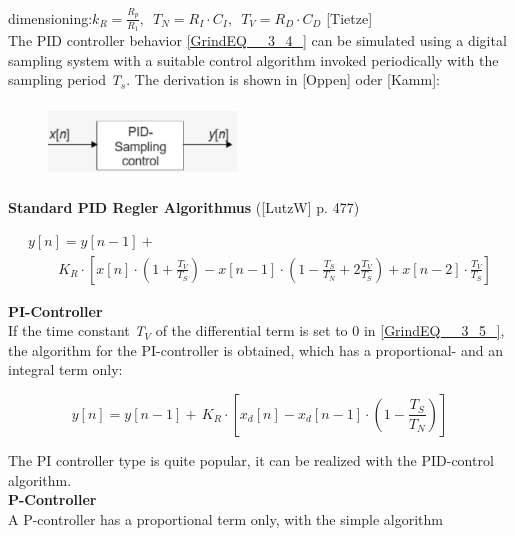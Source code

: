 dimensioning:$k_{R} =\frac{R_{p} }{R_{1} } ,\, \, \, T_{N} =R_{I} \cdot C_{I} ,\, \, \, T_{V} =R_{D} \cdot C_{D} $     [Tietze]\\

The PID controller behavior \eqref{GrindEQ__3_4_} can be simulated using a digital sampling system with a suitable control algorithm invoked periodically with the sampling period \textit{T${}_{s}$}. The derivation is shown in [Oppen] oder [Kamm]:

	\begin{figure}[h]
    \centering
    \includegraphics[width=5cm, height=2cm]{Images/image150.png}
    \label{fig:Fig }
    \end{figure}

\textbf{Standard PID Regler Algorithmus}  ([LutzW] p. 477)

\begin{equation}
	\begin{array}{l} {y[n]=y[n-1]+} \\ {\, \, \, \, \, \, \, \, \, \, \, \, \, K_{R} \cdot \left[x[n]\cdot \left(1+\frac{T_{V} }{T_{S} } \right)-x[n-1]\cdot \left(1-\frac{T_{S} }{T_{N} } +2\frac{T_{V} }{T_{S} } \right)+x[n-2]\cdot \frac{T_{V} }{T_{S} } \right]} \end{array}
\label{EQ }
\end{equation}

{\rot\bf PI-Controller }\\

If the time constant \textit{T${}_{V}$} of the differential term is set to 0 in \eqref{GrindEQ__3_5_}, the algorithm for the PI-controller is obtained, which has a proportional- and an integral term only:

\begin{equation}
	y[n]=y[n-1]+\, K_{R} \cdot \left[x_{d} [n]-x_{d} [n-1]\cdot \left(1-\frac{T_{S} }{T_{N} } \right)\right]
\label{EQ }
\end{equation}

The PI controller type is quite popular, it can be realized with the PID-control algorithm. \\

{\rot\bf P-Controller}\\

A P-controller has a proportional term only, with the simple algorithm

